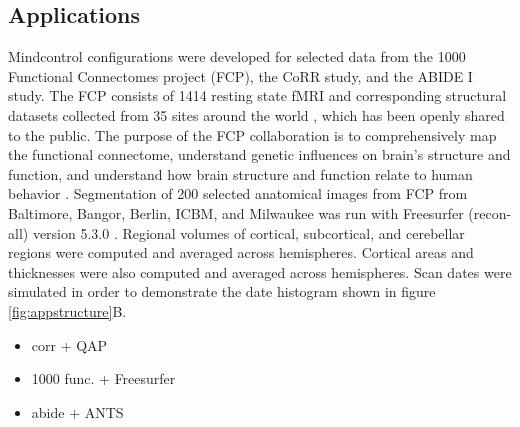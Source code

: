 \subsection{Applications}

Mindcontrol configurations were developed for selected data from the 1000 Functional Connectomes project (FCP), the CoRR study, and the ABIDE I study. The FCP consists of 1414 resting state fMRI and corresponding structural datasets collected from 35 sites around the world  \cite{biswal2010toward}, which has been openly shared to the public. The purpose of the FCP collaboration is to comprehensively map the functional connectome, understand genetic influences on brain's structure and function, and understand how brain structure and function relate to human behavior \cite{biswal2010toward}. Segmentation of 200 selected anatomical images from FCP from Baltimore, Bangor, Berlin, ICBM, and Milwaukee was run with Freesurfer (recon-all) version 5.3.0 \cite{fischl2002whole}. Regional volumes of cortical, subcortical, and cerebellar regions were computed and averaged across hemispheres. Cortical areas and thicknesses were also computed and averaged across hemispheres. Scan dates were simulated in order to demonstrate the date histogram shown in figure \ref{fig:appstructure}B. 



\begin{itemize}
\item corr + QAP
\item 1000 func. + Freesurfer
\item abide + ANTS
\end{itemize}